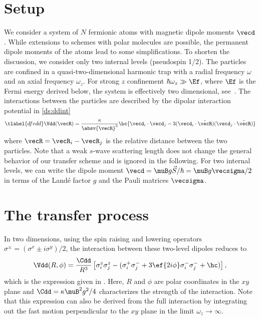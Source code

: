 \section{Setup}

We consider a system of $N$ fermionic atoms with magnetic dipole moments $\vecd$. While extensions to schemes with polar molecules are possible, the permanent dipole moments of the atoms lead to some simplifications.
To shorten the discussion, we consider only two internal levels (pseudospin 1/2). The particles are confined in a quasi-two-dimensional harmonic trap with a radial frequency $\omega$ and an axial frequency $\omega_z$. For strong $z$ confinement $\hbar\omega_z \gg \Ef$, where $\Ef$ is the Fermi energy derived below, the system is effectively two dimensional, see~.
The interactions between the particles are described by the dipolar interaction potential in \cref{ds:ddint}
\begin{align} \tlabel{dfvdd}
\Vdd(\vecR) = \frac{\kappa}{\absv{\vecR}^3} \bc{ \vecd_i \cdot \vecd_j -3 (\vecd_i \cdot \hat{\vecR})(\vecd_j \cdot \hat{\vecR}) }
\end{align}
where $\vecR=\vecR_i-\vecR_j$ is the relative distance between the two particles.
Note that a weak $s$-wave scattering length does not change the general behavior of our transfer scheme and is ignored in the following.
For two internal levels, we can write the
dipole moment $\vecd =  \muB g \vec{S} / \hbar = \muB g \vecsigma/2$ in terms of the Land\'e factor $g$ and the Pauli matrices $\vecsigma$.

\section{The transfer process}
In two dimensions, using the spin raising and lowering operators $\sigma^{\pm} = (\sigma^x \pm i \sigma^y)/2$, the interaction between these two-level dipoles reduces to
\begin{align}
\Vdd(R,\phi) =  \frac{\Cdd}{R^3} \left[
\sigma^z_i \sigma^z_j - (\sigma^+_i \sigma^-_j +3 \ef{2i\phi} \sigma^-_i \sigma^-_j  +\hc)
\right],
\end{align}
which is the expression given in . Here, $R$ and $\phi$ are polar coordinates in the $xy$ plane and $\Cdd = \kappa \muB^2 g^2 / 4$ characterizes the strength of the interaction.
Note that this expression can also be derived from the full interaction  by integrating out the fast motion perpendicular to the $xy$ plane in the limit $\omega_z\rightarrow\infty$.

